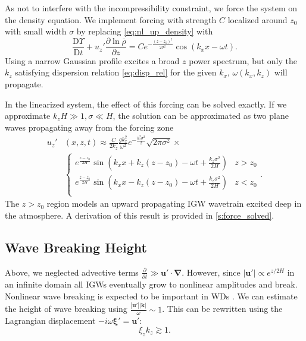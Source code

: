 \documentclass[
        fleqn,
        usenatbib,
    ]{mnras}
\newcommand*{\pd}[2]{\frac{\partial#1}{\partial#2}}
\newcommand*{\md}[2]{\frac{\mathrm{D}#1}{\mathrm{D}#2}}
\newcommand*{\abs}[1]{\left|#1\right|}
\newcommand*{\p}[1]{\left(#1\right)}
\newcommand*{\bm}[1]{\mathbf{#1}}
\begin{document}
As not to interfere with the incompressibility constraint, we force the system
on the density equation. We implement forcing with strength $C$ localized around
$z_0$ with small width $\sigma$ by replacing \autoref{eq:nl_up_density} with
\begin{equation}
    \md{\Upsilon}{t} + u_{z}'\pd{\ln \overline{\rho}}{z}
        = Ce^{-\frac{(z - z_0)^2}{2\sigma^2}}
            \cos \p{k_{x}x - \omega t}.\label{eq:vol_drive}
\end{equation}
Using a narrow Gaussian profile excites a broad $z$ power spectrum, but only the
$k_{z}$ satisfying dispersion relation \autoref{eq:disp_rel} for the given
$k_{x}$, $\omega(k_{x}, k_{z})$ will propagate.

In the linearized system, the effect of this forcing can be solved exactly. If
we approximate $k_zH \gg 1, \sigma \ll H$, the solution can be approximated as
two plane waves propagating away from the forcing zone
\begin{align}
    u_{z}'&(x, z, t) \approx{} \frac{C}{2k_z}\frac{gk_x^2}{\omega^2}
        e^{-\frac{k_z^2\sigma^2}{2}}
        \sqrt{2\pi \sigma^2} \times\nonumber\\
        &{}\begin{cases}
        e^{\frac{z - z_0}{2H}}\sin\p{k_{x}x + k_{z}(z - z_0) - \omega t
            + \frac{k_z\sigma^2}{2H}}
            & z > z_0\\
        e^{\frac{z - z_0}{2H}}\sin\p{k_{x}x - k_{z}(z - z_0) - \omega t
            + \frac{k_z\sigma^2}{2H}}
            & z < z_0\\
    \end{cases}.\label{eq:uz_lin}
\end{align}
The $z > z_0$ region models an upward propagating IGW wavetrain excited deep
in the atmosphere. A derivation of this result is provided in
\autoref{s:force_solved}.

\subsection{Wave Breaking Height}\label{ss:wave_breaking}

Above, we neglected advective terms $\pd{}{t} \gg \bm{u}' \cdot \bm{\nabla}$.
However, since $\abs{\bm{u}'} \propto e^{z/2H}$ in an infinite domain all IGWs
eventually grow to nonlinear amplitudes and break. Nonlinear wave breaking is
expected to be important in WDs \citep{fullerI,fullerII}. We can
estimate the height of wave breaking using $\frac{\abs{\bm{u}'}
\abs{\bm{k}}}{\omega} \sim 1$. This can be rewritten using the Lagrangian
displacement $-i\omega \bm{\xi}' = \bm{u}'$:
\begin{equation}
    \xi_z k_z \gtrsim 1.\label{eq:nl}
\end{equation}
\end{document}
